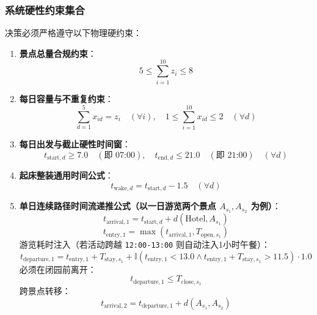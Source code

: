 \documentclass{cumcmthesis}
\begin{document}
\subsubsection{系统硬性约束集合}
决策必须严格遵守以下物理硬约束：
\begin{enumerate}
\item \textbf{景点总量合规约束}：
\begin{equation}
5 \le \sum_{i=1}^{10} z_i \le 8
\end{equation}
\item \textbf{每日容量与不重复约束}：
\begin{equation}
\sum_{d=1}^{5} x_{id} = z_i \quad (\forall i), \quad 1 \le \sum_{i=1}^{10} x_{id} \le 2 \quad (\forall d)
\end{equation}
\item \textbf{每日出发与截止硬性时间窗}：
\begin{equation}
t_{\text{start}, d} \ge 7.0 \quad (\text{即 07:00}), \quad t_{\text{end}, d} \le 21.0 \quad (\text{即 21:00}) \quad (\forall d)
\end{equation}
\item \textbf{起床整装通用时间公式}：
\begin{equation}
t_{\text{wake}, d} = t_{\text{start}, d} - 1.5 \quad (\forall d)
\end{equation}
\item \textbf{单日连续路径时间流递推公式（以一日游览两个景点 $A_{s_1}, A_{s_2}$ 为例）}：
\begin{equation}
t_{\text{arrival}, 1} = t_{\text{start}, d} + d(\text{Hotel}, A_{s_1})
\end{equation}
\begin{equation}
t_{\text{entry}, 1} = \max\left( t_{\text{arrival}, 1}, T_{\text{open}, s_1} \right)
\end{equation}
游览耗时注入（若活动跨越 \texttt{12:00-13:00} 则自动注入1小时午餐）：
\begin{equation}
t_{\text{departure}, 1} = t_{\text{entry}, 1} + T_{\text{stay}, s_1} + \mathbb{I}\left( t_{\text{entry}, 1} < 13.0 \land t_{\text{entry}, 1} + T_{\text{stay}, s_1} > 11.5 \right) \cdot 1.0
\end{equation}
必须在闭园前离开：
\begin{equation}
t_{\text{departure}, 1} \le T_{\text{close}, s_1}
\end{equation}
跨景点转移：
\begin{equation}
t_{\text{arrival}, 2} = t_{\text{departure}, 1} + d(A_{s_1}, A_{s_2})
\end{equation}

\end{enumerate}
\end{document}
